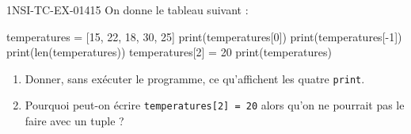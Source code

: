 \begin{exercice}{1NSI-TC-EX-014}{1}{5}
On donne le tableau suivant :
\begin{python}
temperatures = [15, 22, 18, 30, 25]
print(temperatures[0])
print(temperatures[-1])
print(len(temperatures))
temperatures[2] = 20
print(temperatures)
\end{python}
\begin{enumerate}
  \item Donner, sans exécuter le programme, ce qu'affichent les quatre \lstinline{print}.
  \item Pourquoi peut-on écrire \lstinline{temperatures[2] = 20} alors qu'on ne
        pourrait pas le faire avec un tuple ?
\end{enumerate}
\end{exercice}
